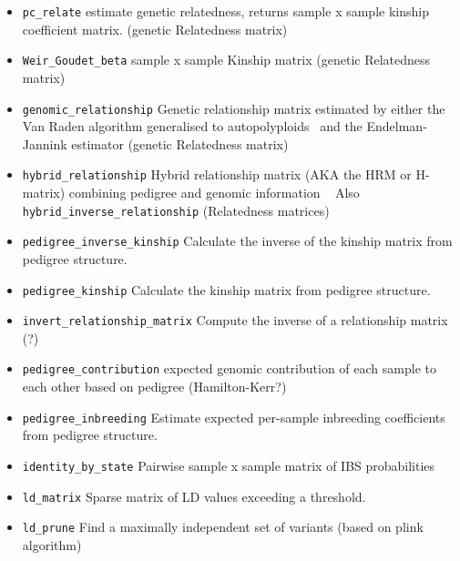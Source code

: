 \documentclass[a4paper,num-refs]{oup-contemporary}
\newcommand{\sgapi}[1]{\texttt{#1}}
\begin{document}
\begin{itemize}

\item \sgapi{pc\_relate} estimate genetic relatedness, returns sample x sample
kinship coefficient matrix. \citep{conomos2016model} (genetic Relatedness matrix)

\item \sgapi{Weir\_Goudet\_beta} sample x sample Kinship matrix
\citep{weir2017unified} (genetic Relatedness matrix)

\item \sgapi{genomic\_relationship} Genetic relationship matrix estimated
by either the Van Raden algorithm generalised to
autopolyploids~\citep{vanraden2008efficient,ashraf2016estimating,bilton2020developing}
and the Endelman-Jannink estimator \citep{endelman2011ridge}
(genetic Relatedness matrix)

\item \sgapi{hybrid\_relationship} Hybrid relationship matrix
(AKA the HRM or H-matrix) combining pedigree and genomic information
~\citep{martini2018effect}
Also \sgapi{hybrid\_inverse\_relationship} (Relatedness matrices)

\item \sgapi{pedigree\_inverse\_kinship} Calculate the inverse of the kinship
matrix from pedigree structure.

\item \sgapi{pedigree\_kinship} Calculate the kinship
matrix from pedigree structure.

\item \sgapi{invert\_relationship\_matrix} Compute the inverse of a
relationship matrix (?)

\item \sgapi{pedigree\_contribution} expected genomic contribution of each
sample to each other based on pedigree (Hamilton-Kerr?)

\item \sgapi{pedigree\_inbreeding} Estimate expected per-sample
inbreeding coefficients from pedigree structure.
\citep{hamilton2018computation}

\item \sgapi{identity\_by\_state} Pairwise sample x sample matrix
of IBS probabilities

\item \sgapi{ld\_matrix} Sparse matrix of LD values exceeding a threshold.
\item \sgapi{ld\_prune} Find a maximally independent set of variants
(based on plink algorithm)


\end{itemize}
\end{document}
